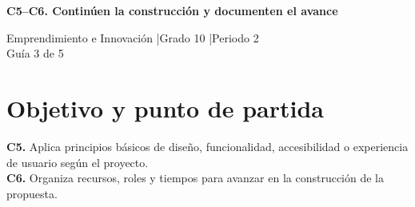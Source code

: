 \makeatletter
{}
\makeatother


\usepackage[spanish]{babel}
\usepackage{lmodern}
\usepackage{titlesec}
\geometry{a4paper,margin=1.6cm}
\linespread{1.10}

\hypersetup{allcolors=LinkColor}
\newcommand{\guidelink}[2]{\href{#1}{\textbf{\underline{#2}}}}
\newcommand{\instruction}[1]{\textcolor{InstructionColor}{\textbf{#1}}}
\newcommand{\concept}[1]{\textcolor{ConceptColor}{\textbf{#1}}}
\newcommand{\checkbox}{%
    \begingroup
    \setlength{\fboxrule}{0.4pt}%
    \setlength{\fboxsep}{2pt}%
    \fbox{\rule{0pt}{0.8ex}\rule{0.8ex}{0pt}}%
    \endgroup}

\setlength{\parskip}{4pt}
\setlength{\tabcolsep}{5pt}
\renewcommand{\arraystretch}{1.15}
\titleformat{\section}{\large\bfseries\color{HeadingColor}}{}{0pt}{}
\titlespacing*{\section}{0pt}{10pt}{3pt}




\begin{center}
{\Large\bfseries\color{HeadingColor} C5--C6. Continúen la construcción y documenten el avance\par}
\vspace{3pt}
Emprendimiento e Innovación \enspace|\enspace Grado 10 \enspace|\enspace Periodo 2\\
Guía 3 de 5
\end{center}

\section*{Objetivo y punto de partida}
\concept{C5.} Aplica principios básicos de diseño, funcionalidad, accesibilidad o experiencia de usuario según el proyecto.\\
\concept{C6.} Organiza recursos, roles y tiempos para avanzar en la construcción de la propuesta.

